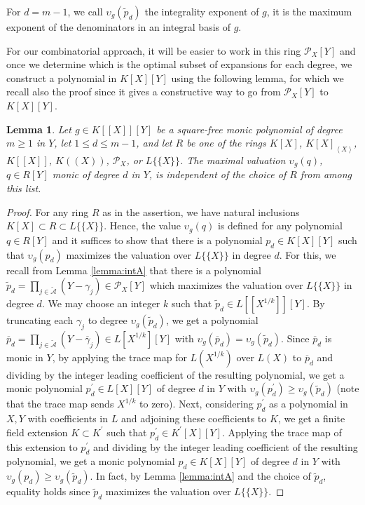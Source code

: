\documentclass[a4paper,11pt]{amsart}%
\theoremstyle{definition}
\theoremstyle{plain}
\newtheorem{lemma}[defn]{Lemma}
\theoremstyle{remark}
\begin{document}
For $d = m - 1$, we call $\upsilon_{g}(\widetilde{p}_d)$ the integrality exponent of $g$, it is the maximum exponent of the denominators in an integral basis of $g$.

For our combinatorial approach, it will be easier to work in this ring $\mathcal{P}_{X}[Y]$ and once we determine which is the optimal subset of expansions for each degree, we construct a polynomial in $K[X][Y]$ using the following lemma, for which we recall also the proof since it gives a constructive way to go from $\mathcal{P}_{X}[Y]$  to $K[X][Y]$.

\begin{lemma}
\label{same exp} Let $g\in K[[X]][Y]$ be a square-free monic polynomial of degree
$m\geq 1$ in $Y$, let $1\leq d \leq m-1$, and let $R$ be one of the rings $K[X]$,
$K[X]_{\left\langle X\right\rangle }$, $K[[X]]$, $K((X))$, ${\mathcal{P}_{X}}$, or $L\{\{X\}\}$.
The maximal valuation $\upsilon_{g}(q)$, $q\in R[Y]$ monic of degree $d$ in $Y$, is
independent of the choice of $R$ from among this list.
\end{lemma}
\begin{proof}
For any ring $R$ as in the assertion, we have natural inclusions $K[X]\subset R \subset L\{\{X\}\}$.
Hence, the value $\upsilon_{g}(q)$  is defined for any polynomial $q\in R[Y]$ and it suffices to show that
there is a polynomial $p_d\in K[X][Y]$ such that $\upsilon_{g}(p_d)$ maximizes the valuation over $L\{\{X\}\}$
in degree $d$. For this, we recall from Lemma \ref{lemma:intA} that there is a polynomial
$\widetilde{p}_d=\prod_{j\in\widetilde{\mathcal{A}}}(Y-\gamma_{j}) \in \mathcal{P}_{X}[Y]$
which maximizes the valuation over $L\{\{X\}\}$ in degree $d$. We may choose an
integer $k$ such that $\widetilde{p}_d\in L[[X^{1/k}]][Y]$. By truncating each
$\gamma_{j}$ to degree $\upsilon_{g}(\widetilde{p}_d)$, we get a polynomial $\overline
{p}_d = \prod_{j\in\widetilde{\mathcal{A}}}(Y-\overline{\gamma}_{j}) \in L[X^{1/k}][Y]$ with $\upsilon_{g}(\overline{p}_d)
= \upsilon_{g}(\widetilde{p}_d)$. Since $\overline{p}_d$ is monic in $Y$, by applying the trace map for
$L(X^{1/k})$ over $L(X)$ to $\overline{p}_d$ and dividing by the integer leading coefficient of the resulting
polynomial, we get a monic polynomial $p_d^\prime\in L[X][Y]$ of degree $d$ in $Y$ with $\upsilon_{g}({p_{d}^\prime})
\geq  \upsilon_{g}(\widetilde{p}_d)$ (note that the trace map sends $X^{1/k}$ to zero).
Next, considering $p_d^\prime$ as a polynomial in $X, Y$ with coefficients in $L$ and
adjoining these coefficients to $K$, we get a finite field extension $K \subset K^\prime$ such that
$p_d^\prime \in K^\prime[X][Y]$. Applying the trace map of this extension to $p_d^\prime$ and
dividing by the integer leading coefficient of the resulting polynomial, we get a monic polynomial
$p_d\in K[X][Y]$ of degree $d$ in $Y$ with $\upsilon_{g}({p_d}) \geq  \upsilon_{g}(\widetilde{p}_d)$.
In fact, by Lemma \ref{lemma:intA} and the choice of $\widetilde{p}_d$, equality holds since
$\widetilde{p}_d$ maximizes the valuation over $L\{\{X\}\}$.
\end{proof}
\end{document}
